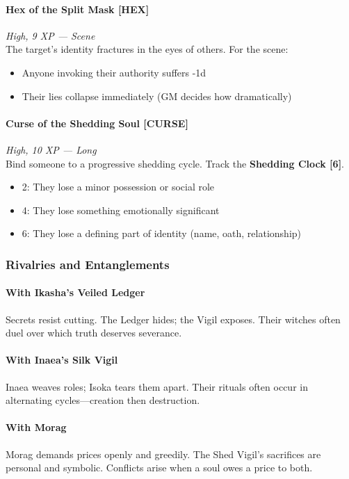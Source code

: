 \documentclass[11pt]{book}
\begin{document}
\paragraph{Hex of the Split Mask [HEX]}
\emph{High, 9 XP --- Scene} \\
The target's identity fractures in the eyes of others.  
For the scene:
\begin{itemize}[leftmargin=*]
    \item Anyone invoking their authority suffers -1d  
    \item Their lies collapse immediately (GM decides how dramatically)  
\end{itemize}

\paragraph{Curse of the Shedding Soul [CURSE]}
\emph{High, 10 XP --- Long} \\
Bind someone to a progressive shedding cycle.  
Track the \textbf{Shedding Clock [6]}.  
\begin{itemize}[leftmargin=*]
    \item 2: They lose a minor possession or social role  
    \item 4: They lose something emotionally significant  
    \item 6: They lose a defining part of identity (name, oath, relationship)  
\end{itemize}

\subsubsection{Rivalries and Entanglements}

\paragraph{With Ikasha's Veiled Ledger}
Secrets resist cutting.  
The Ledger hides; the Vigil exposes.  
Their witches often duel over which truth deserves severance.

\paragraph{With Inaea's Silk Vigil}
Inaea weaves roles; Isoka tears them apart.  
Their rituals often occur in alternating cycles---creation then destruction.

\paragraph{With Morag}
Morag demands prices openly and greedily.  
The Shed Vigil's sacrifices are personal and symbolic.  
Conflicts arise when a soul owes a price to both.
\end{document}
